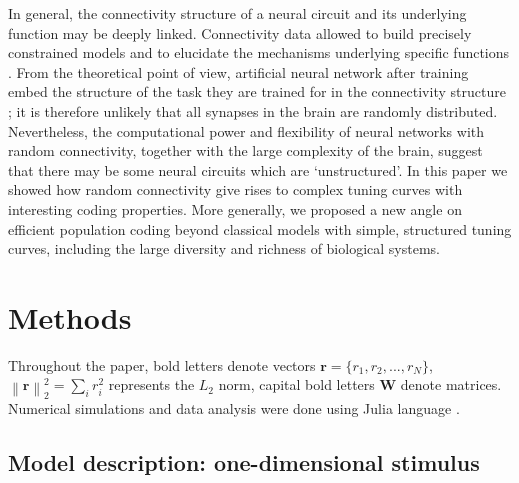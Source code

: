 \documentclass[a4paper]{article}%
\begin{document}
In general, the connectivity structure of a neural circuit and its underlying function may be deeply linked.
Connectivity data allowed to build precisely constrained models
\cite[]{Litwin-Kumar2019ConstrainingDiagrams} and to elucidate the mechanisms
underlying specific functions \cite[]{Kim2014Space-timeRetina}. From the
theoretical point of view, artificial neural network after training embed the
structure of the task they are trained for in the connectivity structure
\cite[]{Farrell2020AutoencoderConnectomes}; it is therefore unlikely that all
synapses in the brain are randomly distributed. Nevertheless, the
computational power and flexibility of neural networks with random
connectivity, together with the large complexity of the brain, suggest that
there may be some neural circuits which are `unstructured'. In this paper we
showed how random connectivity give rises to complex tuning curves with
interesting coding properties. More generally, we proposed a new angle on
efficient population coding beyond classical models with simple, structured
tuning curves, including the large diversity and richness of biological systems.

\section{Methods}

\label{Se:Me} Throughout the paper, bold letters denote vectors $\mathbf{r} =
\{r_{1},r_{2},...,r_{N} \}$, $\left\|  \mathbf{r} \right\| _{2}^{2} = \sum_{i}
r_{i}^{2}$ represents the $L_{2}$ norm, capital bold letters $\mathbf{W}$
denote matrices. Numerical simulations and data analysis were done using Julia
language \cite[]{Bezanson2017Julia:Computing}.

\subsection{Model description: one-dimensional stimulus}
\end{document}
